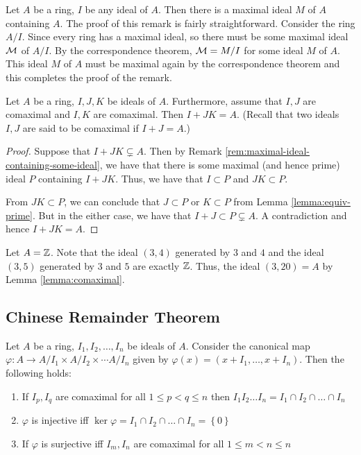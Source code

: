 \begin{remark}
    Let $A$ be a ring, $I$ be any ideal of $A$. Then there is a maximal ideal $M$ of $A$ containing $A$. The proof of this remark is fairly straightforward. Consider the ring $A/I$. Since every ring has a maximal ideal, so there must be some maximal ideal ${\cal M}$ of $A/I$. By the correspondence theorem, ${\cal M} = M/I$ for some ideal $M$ of $A$. This ideal $M$ of $A$ must be maximal again by the correspondence theorem and this completes the proof of the remark.
    \label{rem:maximal-ideal-containing-some-ideal}
\end{remark}

\begin{lemma}
    Let $A$ be a ring, $I, J, K$ be ideals of $A$. Furthermore, assume that $I, J$ are comaximal and $I, K$ are comaximal. Then $I+JK=A$. (Recall that two ideals $I,J$ are said to be comaximal if $I+J=A$.)
    \label{lemma:comaximal}
\end{lemma}
\begin{proof}
    Suppose that $I+JK \subsetneq A$. Then by Remark \ref{rem:maximal-ideal-containing-some-ideal}, we have that there is some maximal (and hence prime) ideal $P$ containing $I+JK$. Thus, we have that $I\subset P$ and $JK \subset P$. 

    From $JK \subset P$, we can conclude that $J\subset P$ or $K \subset P$ from Lemma \ref{lemma:equiv-prime}. But in the either case, we have that $I+J \subset P \subsetneq A$. A contradiction and hence $I+JK = A$.
\end{proof}

\begin{example}
    Let $A=\mathbb Z$. Note that the ideal $\left( 3,4 \right)$ generated by $3$ and $4$ and the ideal $\left( 3,5 \right)$ generated by $3$ and $5$ are exactly $\mathbb Z$. Thus, the ideal $\left( 3, 20 \right) =A$ by Lemma \ref{lemma:comaximal}.
\end{example}

\subsection{Chinese Remainder Theorem}

\begin{theorem}
    Let $A$ be a ring, $I_1 , I_2 , \ldots , I_n$ be ideals of $A$. Consider the canonical map $\varphi : A \to A/I_1 \times A/I_2 \times \cdots A/I_n$ given by $\varphi \left( x \right) = \left( x+I_1 , \ldots , x+I_n \right)$. Then the following holds:
    \begin{enumerate}
	\item If $I_p , I_q$ are comaximal for all $1 \le p < q \le n$ then $I_1 I_2 \ldots I_n = I_1 \cap I_2 \cap \ldots \cap I_n$
	\item $\varphi$ is injective iff $\ker \varphi = I_1 \cap I_2 \cap \ldots \cap I_n = \left\{ 0 \right\}$
	\item If $\varphi$ is surjective iff $I_m , I_n$ are comaximal for all $1\le m < n \le n$
    \end{enumerate}
    \label{thm:CRT}
\end{theorem}

